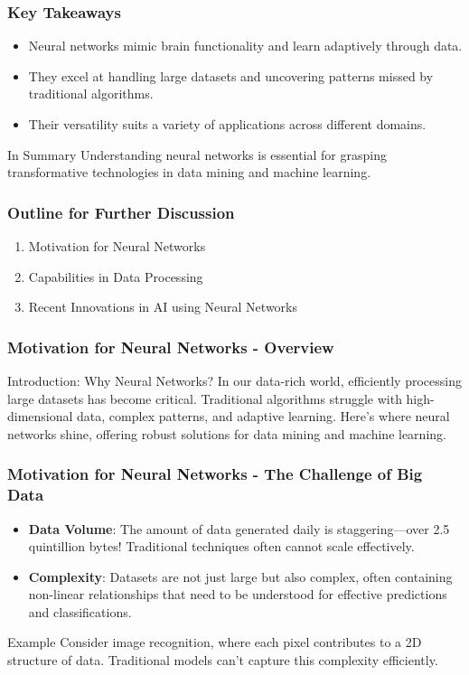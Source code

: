 \documentclass[aspectratio=169]{beamer}
\begin{document}
\begin{frame}[fragile]
    \frametitle{Key Takeaways}
    \begin{itemize}
        \item Neural networks mimic brain functionality and learn adaptively through data.
        \item They excel at handling large datasets and uncovering patterns missed by traditional algorithms.
        \item Their versatility suits a variety of applications across different domains.
    \end{itemize}
    \begin{block}{In Summary}
        Understanding neural networks is essential for grasping transformative technologies in data mining and machine learning.
    \end{block}
\end{frame}

\begin{frame}[fragile]
    \frametitle{Outline for Further Discussion}
    \begin{enumerate}
        \item Motivation for Neural Networks
        \item Capabilities in Data Processing
        \item Recent Innovations in AI using Neural Networks
    \end{enumerate}
\end{frame}

\begin{frame}[fragile]
    \frametitle{Motivation for Neural Networks - Overview}
    \begin{block}{Introduction: Why Neural Networks?}
        In our data-rich world, efficiently processing large datasets has become critical. Traditional algorithms struggle with high-dimensional data, complex patterns, and adaptive learning. Here’s where neural networks shine, offering robust solutions for data mining and machine learning.
    \end{block}
\end{frame}

\begin{frame}[fragile]
    \frametitle{Motivation for Neural Networks - The Challenge of Big Data}
    \begin{itemize}
        \item \textbf{Data Volume}: The amount of data generated daily is staggering—over 2.5 quintillion bytes! Traditional techniques often cannot scale effectively.
        \item \textbf{Complexity}: Datasets are not just large but also complex, often containing non-linear relationships that need to be understood for effective predictions and classifications.
    \end{itemize}
    \begin{block}{Example}
        Consider image recognition, where each pixel contributes to a 2D structure of data. Traditional models can’t capture this complexity efficiently.
    \end{block}
\end{frame}
\end{document}
